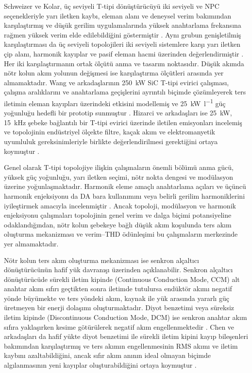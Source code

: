Schweizer ve Kolar, üç seviyeli T-tipi dönüştürücüyü iki seviyeli ve NPC seçenekleriyle yarı iletken kaybı, eleman alanı ve deneysel verim bakımından karşılaştırmış ve düşük gerilim uygulamalarında yüksek anahtarlama frekansına rağmen yüksek verim elde edilebildiğini göstermiştir \citep{Schweizer2013}. Aynı grubun genişletilmiş karşılaştırması da üç seviyeli topolojileri iki seviyeli sistemlere karşı yarı iletken çip alanı, harmonik kayıplar ve pasif eleman hacmi üzerinden değerlendirmiştir \citep{Schweizer2013Karsilastirma}. Her iki karşılaştırmanın ortak ölçütü anma ve tasarım noktasıdır. Düşük akımda nötr kolun akım yolunun değişmesi ise karşılaştırma ölçütleri arasında yer almamaktadır. Wang ve arkadaşlarının \SI{250}{\kilo\watt} SiC T-tipi evirici çalışması, çalışma aralıklarını ve anahtarlama geçişlerini ayrıntılı biçimde çözümleyerek ters iletimin eleman kayıpları üzerindeki etkisini modellemiş ve \SI{25}{\kilo\watt\per\litre} güç yoğunluğu hedefli bir prototip sunmuştur \citep{Wang2020}. Hizarci ve arkadaşları ise \SI{25}{\kilo\watt}, \SI{15}{\kilo\hertz} şebeke bağlantılı bir T-tipi evirici üzerinde iletilen emisyonları incelemiş ve topolojinin endüstriyel ölçekte filtre, kaçak akım ve elektromanyetik uyumluluk gereksinimleriyle birlikte değerlendirilmesi gerektiğini ortaya koymuştur \citep{Hizarci2021}.

Genel olarak T-tipi topolojiye ilişkin çalışmaların önemli bölümü anma gücü, yüksek güç yoğunluğu, yarı iletken seçimi, nötr nokta dengesi ve modülasyon üzerine yoğunlaşmaktadır. Harmonik eleme amaçlı anahtarlama açıları ve üçüncü harmonik enjeksiyonu da DA bara kullanımını veya belirli gerilim harmoniklerini iyileştirmek amacıyla incelenmiştir \citep{Aghdam2013,Holmes2003}. Ancak topoloji, modülasyon ve harmonik enjeksiyonu çalışmaları topolojinin genel verim ve dalga biçimi potansiyeline odaklandığından, nötr kolun şebekeye bağlı düşük akım koşulunda ters akım oluşturma mekanizması ve verim--THD ödünleşimi bu çalışmaların merkezinde yer almamaktadır.

Nötr kolun ters akım oluşturma mekanizması ise senkron alçaltıcı dönüştürücünün hafif yük davranışı üzerinden açıklanabilir. Senkron alçaltıcı dönüştürücüde sürekli iletim kipinde (Continuous Conduction Mode, CCM) alt anahtar akım sıfırı geçtikten sonra iletimde tutulursa endüktör akımı negatif yönde büyümekte ve ters yöndeki akım, kaynak ile yük arasında yararlı güç üretmeyen bir enerji dolaşımı oluşturmaktadır. Diyot benzetimi veya süreksiz iletim kipinde (Discontinuous Conduction Mode, DCM) ise senkron anahtar akım sıfıra yaklaşırken kesime götürülerek negatif akım engellenmektedir \citep{Erickson2001,Mohan2003}. Chen ve arkadaşları da hafif yükte diyot benzetimi ile sürekli iletim kipini kayıp bileşenleri bakımından karşılaştırmış ve ters akımın engellenmesinin RMS akımı ve iletim kaybını azaltabildiğini, ancak sıfır akım anının ideal olmayan biçimde algılanmasının yeni kayıplar oluşturabildiğini ortaya koymuştur \citep{Chen2010}.

